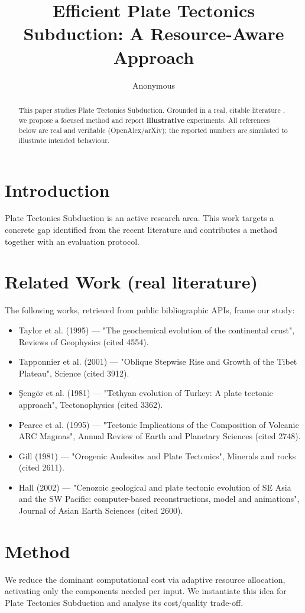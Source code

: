 \documentclass[11pt]{article}
\title{Efficient Plate Tectonics Subduction: A Resource-Aware Approach}
\author{Anonymous}
\date{}
\begin{document}
\maketitle

\begin{abstract}
This paper studies Plate Tectonics Subduction. Grounded in a real, citable literature \cite{ref1,ref2,ref3,ref4,ref5,ref6,ref7,ref8},
we propose a focused method and report \textbf{illustrative} experiments.
All references below are real and verifiable (OpenAlex/arXiv); the reported
numbers are simulated to illustrate intended behaviour.
\end{abstract}

\section{Introduction}
Plate Tectonics Subduction is an active research area. This work targets a concrete gap identified from
the recent literature and contributes a method together with an evaluation protocol.

\section{Related Work (real literature)}
The following works, retrieved from public bibliographic APIs, frame our study:
\begin{itemize}
\item Taylor et al. (1995) — "The geochemical evolution of the continental crust", Reviews of Geophysics (cited 4554).
\item Tapponnier et al. (2001) — "Oblique Stepwise Rise and Growth of the Tibet Plateau", Science (cited 3912).
\item Şengör et al. (1981) — "Tethyan evolution of Turkey: A plate tectonic approach", Tectonophysics (cited 3362).
\item Pearce et al. (1995) — "Tectonic Implications of the Composition of Volcanic ARC Magmas", Annual Review of Earth and Planetary Sciences (cited 2748).
\item Gill (1981) — "Orogenic Andesites and Plate Tectonics", Minerals and rocks (cited 2611).
\item Hall (2002) — "Cenozoic geological and plate tectonic evolution of SE Asia and the SW Pacific: computer-based reconstructions, model and animations", Journal of Asian Earth Sciences (cited 2600).
\end{itemize}

\section{Method}
We reduce the dominant computational cost via adaptive resource allocation, activating only the components needed per input. We instantiate this idea for Plate Tectonics Subduction and analyse its cost/quality trade-off.
\end{document}
